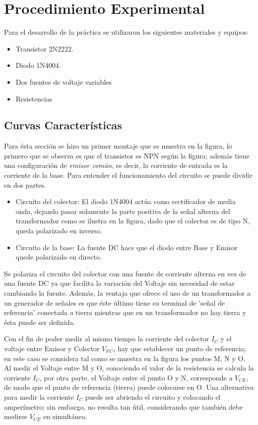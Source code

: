 \section{Procedimiento Experimental}
Para el desarrollo de la práctica se utilizaron los siguientes materiales y equipos:
\begin{itemize}
    \item Transistor 2N2222.
    \item Diodo 1N4004.
    \item Dos fuentes de voltaje variables
    \item Resistencias
\end{itemize}
\subsection{Curvas Características}
Para ésta sección se hizo un primer montaje que se muestra en la figura, lo primero que se observa es que el transistor es NPN según la figura; además tiene una configuración de \textit{emisor común}, es decir, la corriente de entrada es la corriente de la base. Para entender el funcionamiento del circuito se puede dividir en dos partes.

\begin{itemize}
    \item Circuito del colector: El diodo 1N4004 actúa como rectificador de media onda, dejando pasar solamente la parte positiva de la señal alterna del transformador como se ilustra en la figura, dado que el colector es de tipo N, queda polarizado en inverso.
    \item Circuito de la base: La fuente DC hace que el diodo entre Base y Emisor quede polarizado en directo.
\end{itemize}
Se polariza el circuito del colector con una fuente de corriente alterna en vez de una fuente DC ya que facilita la variación del Voltaje sin necesidad de estar cambiando la fuente. Además, la ventaja que ofrece el uso de un transformador a un generador de señales es que éste último tiene su terminal de 'señal de referencia' conectada a tierra mientras que en un transformador no hay tierra y ésta puede ser definida.


Con el fin de poder medir al mismo tiempo la corriente del colector $I_{C}$ y el voltaje entre Emisor y Colector $V_{EC}$, hay que establecer un punto de referencia; en este caso se considera tal como se muestra en la figura  los puntos M, N y O. Al medir el Voltaje entre M y O, conociendo el valor de la resistencia se calcula la corriente $I_{C}$, por otra parte, el Voltaje entre el punto O y N, corresponde a $V_{CE}$, de modo que el punto de referencia (tierra) puede colocarse en O.
Una alternativa para medir la corriente $I_{C}$ puede ser abriendo el circuito y colocando el amperímetro; sin embargo, no resulta tan útil, considerando que también debe medirse $V_{CE}$ en simultáneo.

